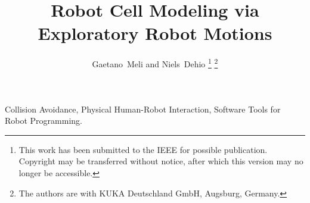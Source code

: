 \documentclass[lettersize,journal]{IEEEtran}
\begin{document}
\title{Robot Cell Modeling via\\Exploratory Robot Motions}
\author{
	Gaetano~Meli and Niels~Dehio%
	\thanks{
			This work has been submitted to the IEEE for possible publication. 
			Copyright may be transferred without notice, 
			after which this version may no longer be accessible.
			}
	\thanks{
			The authors are with %
			KUKA Deutschland GmbH, 
			Augsburg, 
			Germany.
			}
}


\maketitle



\begin{IEEEkeywords}
Collision Avoidance, Physical Human-Robot Interaction, Software Tools for Robot Programming.
\end{IEEEkeywords}













\balance



\end{document}
